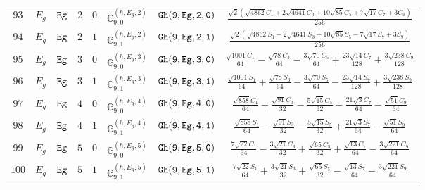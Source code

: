 \documentclass[fleqn,8pt]{jsarticle}
\begin{document}
\begin{table}[ht!]
\begin{center}
\begin{tabular}{cccccccc}
$ 93 $ & $ E_{g} $ & $ {\tt Eg} $ & $ 2 $ & $ 0 $ & $ \mathbb{G}_{9,0}^{(h,E_{g},2)} $ & $ {\tt Gh(9,Eg,2,0)} $ & $ \frac{\sqrt{2} \left(\sqrt{4862} C_{1} + 2 \sqrt{4641} C_{3} + 10 \sqrt{85} C_{5} + 7 \sqrt{17} C_{7} + 3 C_{9}\right)}{256} $ \\
$ 94 $ & $ E_{g} $ & $ {\tt Eg} $ & $ 2 $ & $ 1 $ & $ \mathbb{G}_{9,1}^{(h,E_{g},2)} $ & $ {\tt Gh(9,Eg,2,1)} $ & $ \frac{\sqrt{2} \left(\sqrt{4862} S_{1} - 2 \sqrt{4641} S_{3} + 10 \sqrt{85} S_{5} - 7 \sqrt{17} S_{7} + 3 S_{9}\right)}{256} $ \\
$ 95 $ & $ E_{g} $ & $ {\tt Eg} $ & $ 3 $ & $ 0 $ & $ \mathbb{G}_{9,0}^{(h,E_{g},3)} $ & $ {\tt Gh(9,Eg,3,0)} $ & $ \frac{\sqrt{1001} C_{1}}{64} - \frac{\sqrt{78} C_{3}}{64} - \frac{3 \sqrt{70} C_{5}}{64} + \frac{23 \sqrt{14} C_{7}}{128} + \frac{3 \sqrt{238} C_{9}}{128} $ \\
$ 96 $ & $ E_{g} $ & $ {\tt Eg} $ & $ 3 $ & $ 1 $ & $ \mathbb{G}_{9,1}^{(h,E_{g},3)} $ & $ {\tt Gh(9,Eg,3,1)} $ & $ \frac{\sqrt{1001} S_{1}}{64} + \frac{\sqrt{78} S_{3}}{64} - \frac{3 \sqrt{70} S_{5}}{64} - \frac{23 \sqrt{14} S_{7}}{128} + \frac{3 \sqrt{238} S_{9}}{128} $ \\
$ 97 $ & $ E_{g} $ & $ {\tt Eg} $ & $ 4 $ & $ 0 $ & $ \mathbb{G}_{9,0}^{(h,E_{g},4)} $ & $ {\tt Gh(9,Eg,4,0)} $ & $ \frac{\sqrt{858} C_{1}}{64} + \frac{\sqrt{91} C_{3}}{32} - \frac{5 \sqrt{15} C_{5}}{32} - \frac{21 \sqrt{3} C_{7}}{64} - \frac{\sqrt{51} C_{9}}{64} $ \\
$ 98 $ & $ E_{g} $ & $ {\tt Eg} $ & $ 4 $ & $ 1 $ & $ \mathbb{G}_{9,1}^{(h,E_{g},4)} $ & $ {\tt Gh(9,Eg,4,1)} $ & $ \frac{\sqrt{858} S_{1}}{64} - \frac{\sqrt{91} S_{3}}{32} - \frac{5 \sqrt{15} S_{5}}{32} + \frac{21 \sqrt{3} S_{7}}{64} - \frac{\sqrt{51} S_{9}}{64} $ \\
$ 99 $ & $ E_{g} $ & $ {\tt Eg} $ & $ 5 $ & $ 0 $ & $ \mathbb{G}_{9,0}^{(h,E_{g},5)} $ & $ {\tt Gh(9,Eg,5,0)} $ & $ \frac{7 \sqrt{22} C_{1}}{64} - \frac{3 \sqrt{21} C_{3}}{32} + \frac{\sqrt{65} C_{5}}{32} + \frac{\sqrt{13} C_{7}}{64} - \frac{3 \sqrt{221} C_{9}}{64} $ \\
$ 100 $ & $ E_{g} $ & $ {\tt Eg} $ & $ 5 $ & $ 1 $ & $ \mathbb{G}_{9,1}^{(h,E_{g},5)} $ & $ {\tt Gh(9,Eg,5,1)} $ & $ \frac{7 \sqrt{22} S_{1}}{64} + \frac{3 \sqrt{21} S_{3}}{32} + \frac{\sqrt{65} S_{5}}{32} - \frac{\sqrt{13} S_{7}}{64} - \frac{3 \sqrt{221} S_{9}}{64} $ \\
 \hline \hline
\end{tabular}
\end{center}
\end{table}
\end{document}
